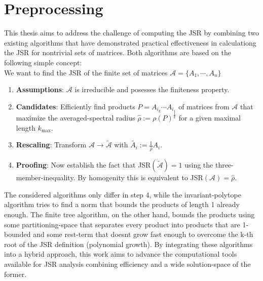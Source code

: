 \section{Preprocessing}
This thesis aims to address the challenge of computing the JSR by combining two existing algorithms that have demonstrated practical effectiveness in calculationg the JSR for nontrivial sets of matrices. Both algorithms are based on the following simple concept: \\

We want to find the JSR of the finite set of matrices $\mathcal{A} = \{A_1, \cdots, A_n\}$
\begin{enumerate}
    \item \textbf{Assumptions}: $\mathcal{A}$ is irreducible and posesses the finiteness property. 
    \item \textbf{Candidates}: Efficiently find products $P = A_{i_k} \cdots A_{i_1}$ of matrices from $\mathcal{A}$ that maximize the averaged-spectral radius $\hat{\rho} := \rho(P)^\frac{1}{k}$ for a given maximal length $k_{\text{max}}$.
    \item \textbf{Rescaling}: Transform $\mathcal{A} \to \tilde{\mathcal{A}}$ with $\tilde{A_i} := \frac{1}{\hat{\rho}} A_i$.
    \item \textbf{Proofing}: Now establish the fact that JSR$(\tilde{\mathcal{A}}) = 1$ using the three-member-inequality. By homogenity this is equivalent to JSR$(\mathcal{A}) = \hat{\rho}$.
\end{enumerate}

The considered algorithms only differ in step 4, while the invariant-polytope algorithm tries to find a norm that bounds the products of length 1 already enough. The finite tree algorithm, on the other hand, bounds the products using some partitioning-space that separates every product into products that are 1-bounded and some rest-term that doesnt grow fast enough to overcome the k-th root of the JSR definition (polynomial growth).
By integrating these algorithms into a hybrid approach, this work aims to advance the computational tools available for JSR analysis combining efficiency and a wide solution-space of the former.
